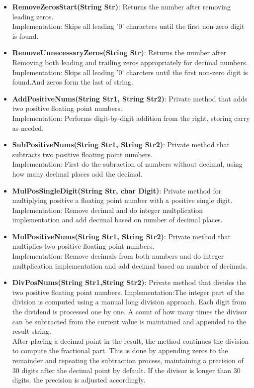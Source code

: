 \documentclass{article}
\begin{document}
\begin{itemize}
    \item \textbf{RemoveZerosStart(String Str)}: Returns the number after removing leading zeros. \\
    Implementation: Skips all leading '0' characters until the first non-zero digit is found.
    
    \item \textbf{RemoveUnnecessaryZeros(String Str)}: Returns the number after Removing both leading and trailing zeros appropriately for decimal numbers.
    Implementation: Skips all leading '0' charcters until the first non-zero digit is found.And zeros form the last of string.

    \item \textbf{AddPositiveNums(String Str1, String Str2)}: Private method that adds two positive floating point numbers. \\
    Implementation: Performs digit-by-digit addition from the right, storing carry as needed.

    \item \textbf{SubPositiveNums(String Str1, String Str2)}: Private method that subtracts two positive floating point numbers. \\
    Implementation: First do the subraction of numbers without decimal, using how many decimal places add the decimal.

    \item \textbf{MulPosSingleDigit(String Str, char Digit)}: Private method for multiplying positive a floating point number with a positive single digit. \\
    Implementation: Remove decimal and do integer multplication implementation and add decimal based on number of decimal places.

    \item \textbf{MulPositiveNums(String Str1, String Str2)}: Private method that multiplies two positive floating point numbers. \\
    Implementation: Remove decimals from both numbers and do integer multplication implementation and add decimal based on number of decimals.

    \item \textbf{DivPosNums(String Str1,String Str2)}: Private method that
    divides the two positive floating point numbers.
    Implementation:The integer part of the division is computed using a manual long division approach. Each digit from the dividend is processed one by one. A count of how many times the divisor can be subtracted from the current value is maintained and appended to the result string.\\
    After placing a decimal point in the result, the method continues the division to compute the fractional part. This is done by appending zeros to the remainder and repeating the subtraction process, maintaining a precision of 30 digits after the decimal point by default. If the divisor is longer than 30 digits, the precision is adjusted accordingly.


\end{itemize}
\end{document}
